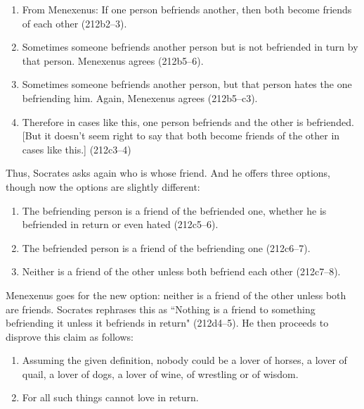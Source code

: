 \documentclass[11pt]{article}
\begin{document}
\begin{enumerate}

    \item From Menexenus: If one person befriends another, then both become
        friends of each other (212b2--3).

    \item Sometimes someone befriends another person but is not befriended in
        turn by that person.  Menexenus agrees (212b5--6).

    \item Sometimes someone befriends another person, but that person hates the
        one befriending him.  Again, Menexenus agrees (212b5--c3).

    \item Therefore in cases like this, one person befriends and the other is
        befriended. [But it doesn't seem right to say that both become friends
        of the other in cases like this.] (212c3--4)

\end{enumerate}

Thus, Socrates asks again who is whose friend. And he offers three options,
though now the options are slightly different:

\begin{enumerate}

    \item The befriending person is a friend of the befriended one, whether he
        is befriended in return or even hated (212c5--6).

    \item The befriended person is a friend of the befriending one (212c6--7).

    \item Neither is a friend of the other unless both befriend each other
        (212c7--8).

\end{enumerate}

Menexenus goes for the new option: neither is a friend of the other unless both
are friends.  Socrates rephrases this as ``Nothing is a friend to something
befriending it unless it befriends in return" (212d4--5).  He then proceeds to
disprove this claim as follows:

\begin{enumerate}

    \item Assuming the given definition, nobody could be a lover of horses,
        a lover of quail, a lover of dogs, a lover of wine, of wrestling or of
        wisdom.

    \item For all such things cannot love in return.

\end{enumerate}
\end{document}

